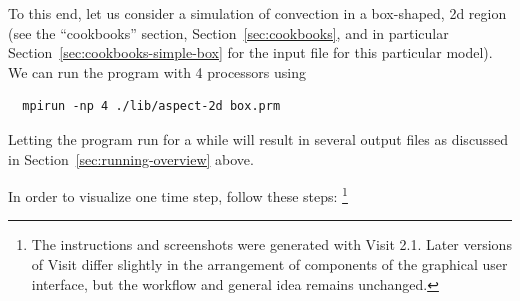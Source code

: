 \documentclass{article}
\begin{document}
To this end, let us consider a simulation of convection in a box-shaped, 2d
region (see the ``cookbooks'' section, Section~\ref{sec:cookbooks}, and in
particular Section~\ref{sec:cookbooks-simple-box} for
the input file for this particular model). We can run the program with 4 processors using
\begin{verbatim}
  mpirun -np 4 ./lib/aspect-2d box.prm
\end{verbatim}
Letting the program run for a while will result in several output files as
discussed in Section~\ref{sec:running-overview} above.

In order to visualize one time step, follow these steps:%
\footnote{The instructions and screenshots were generated with Visit
  2.1. Later versions of Visit differ slightly in the arrangement of
  components of the graphical user interface, but the workflow and general
  idea remains unchanged.}
\end{document}
